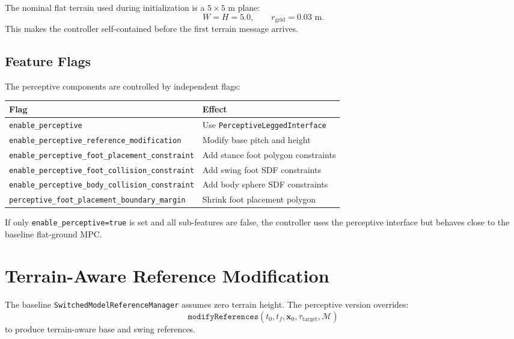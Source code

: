 \documentclass[11pt,a4paper]{article}
\begin{document}
The nominal flat terrain used during initialization is a $5\times5$ m plane:
\begin{equation}
	W=H=5.0,\qquad r_{\text{grid}}=0.03\text{ m}.
\end{equation}
This makes the controller self-contained before the first terrain message arrives.

\subsection{Feature Flags}

The perceptive components are controlled by independent flags:
\begin{center}
	\begin{tabular}{ll}
		\toprule
		\textbf{Flag} & \textbf{Effect} \\
		\midrule
		\texttt{enable\_perceptive} & Use \texttt{PerceptiveLeggedInterface} \\
		\texttt{enable\_perceptive\_reference\_modification} & Modify base pitch and height \\
		\texttt{enable\_perceptive\_foot\_placement\_constraint} & Add stance foot polygon constraints \\
		\texttt{enable\_perceptive\_foot\_collision\_constraint} & Add swing foot SDF constraints \\
		\texttt{enable\_perceptive\_body\_collision\_constraint} & Add body sphere SDF constraints \\
		\texttt{perceptive\_foot\_placement\_boundary\_margin} & Shrink foot placement polygon \\
		\bottomrule
	\end{tabular}
\end{center}

If only \texttt{enable\_perceptive=true} is set and all sub-features are false, the controller uses the perceptive interface but behaves close to the baseline flat-ground MPC.


\section{Terrain-Aware Reference Modification}
\label{sec:reference_modification}

The baseline \texttt{SwitchedModelReferenceManager} assumes zero terrain height. The perceptive version overrides:
\begin{equation}
	\texttt{modifyReferences}(t_0,t_f,\bm{x}_0,\tau_{\text{target}},\mathcal{M})
\end{equation}
to produce terrain-aware base and swing references.
\end{document}
